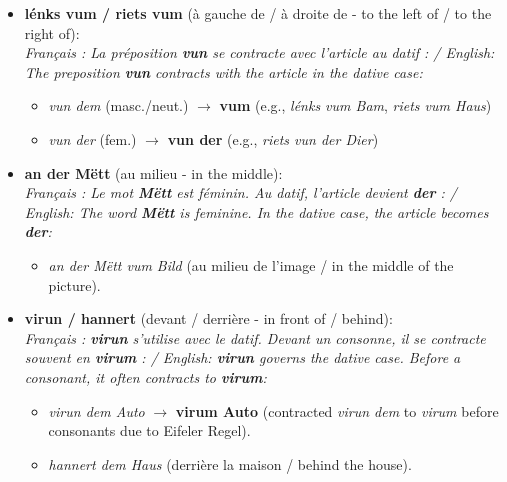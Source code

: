 \begin{itemize}
    \item \textbf{lénks vum / riets vum} (à gauche de / à droite de - to the left of / to the right of): \\
    \textit{Français : La préposition \textbf{vun} se contracte avec l'article au datif : / English: The preposition \textbf{vun} contracts with the article in the dative case:}
    \begin{itemize}
        \item \textit{vun dem} (masc./neut.) $\rightarrow$ \textbf{vum} (e.g., \textit{lénks vum Bam}, \textit{riets vum Haus})
        \item \textit{vun der} (fem.) $\rightarrow$ \textbf{vun der} (e.g., \textit{riets vun der Dier})
    \end{itemize}
    
    \item \textbf{an der Mëtt} (au milieu - in the middle): \\
    \textit{Français : Le mot \textbf{Mëtt} est féminin. Au datif, l'article devient \textbf{der} : / English: The word \textbf{Mëtt} is feminine. In the dative case, the article becomes \textbf{der}:}
    \begin{itemize}
        \item \textit{an der Mëtt vum Bild} (au milieu de l'image / in the middle of the picture).
    \end{itemize}
    
    \item \textbf{virun / hannert} (devant / derrière - in front of / behind): \\
    \textit{Français : \textbf{virun} s'utilise avec le datif. Devant un consonne, il se contracte souvent en \textbf{virum} : / English: \textbf{virun} governs the dative case. Before a consonant, it often contracts to \textbf{virum}:}
    \begin{itemize}
        \item \textit{virun dem Auto} $\rightarrow$ \textbf{virum Auto} (contracted \textit{virun dem} to \textit{virum} before consonants due to Eifeler Regel).
        \item \textit{hannert dem Haus} (derrière la maison / behind the house).
    \end{itemize}
    

\end{itemize}
